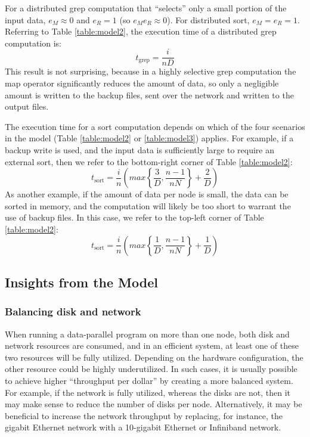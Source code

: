 \documentclass[ 11pt, letterpaper]{article}%
\begin{document}
For a distributed grep computation that ``selects'' only a small portion of the input data, $e_M \approx 0$ and $e_R = 1$ (so $e_M e_R \approx 0$). For distributed sort, $e_M = e_R = 1$. Referring to Table \ref{table:model2}, the execution time of a distributed grep computation is:
\begin{equation}
t_\text{grep} = \frac{i}{n D}
\label{eqn:grepmodel}
\end{equation}
This result is not surprising, because in a highly selective grep computation
the map operator significantly reduces the amount of data, so only a negligible
amount is written to the backup files, sent over the network and written to the output
files.

The execution time for a sort computation depends on which of the four
scenarios in the model (Table \ref{table:model2} or \ref{table:model3})
applies. For example, if a backup write is used, and the input data is sufficiently large to require an
external sort, then we refer to the bottom-right corner of Table
\ref{table:model2}:
\begin{equation}
t_\text{sort} = \frac{i}{n} \left( max\left\{\frac{3}{D}, \frac{n-1}{n
N}\right\} + \frac{2}{D} \right)
\label{eqn:sortmodel1}
\end{equation}
As another example, if the amount of data per node is small, the data can be sorted in memory, and the computation will likely be too short to warrant the use of backup files. In this case, we refer to the top-left corner of Table \ref{table:model2}:
\begin{equation}
t_\text{sort} = \frac{i}{n} \left( max\left\{\frac{1}{D}, \frac{n-1}{n
N}\right\} + \frac{1}{D} \right)
\label{eqn:sortmodel2}
\end{equation}

\subsection{Insights from the Model}

\subsubsection{Balancing disk and network}

When running a data-parallel program on more than one node, both disk and
network resources are consumed, and in an efficient system, at least one of
these two resources will be fully utilized. Depending on the hardware configuration, the
other resource could be highly underutilized. In such cases, it is usually
possible to achieve higher ``throughput per dollar'' by creating a more balanced
system. For example, if the network is fully utilized, whereas the disks are
not, then it may make sense to reduce the number of disks per node.
Alternatively, it may be beneficial to increase the network throughput by
replacing, for instance, the gigabit Ethernet network with a 10-gigabit Ethernet or Infiniband network.
\end{document}
